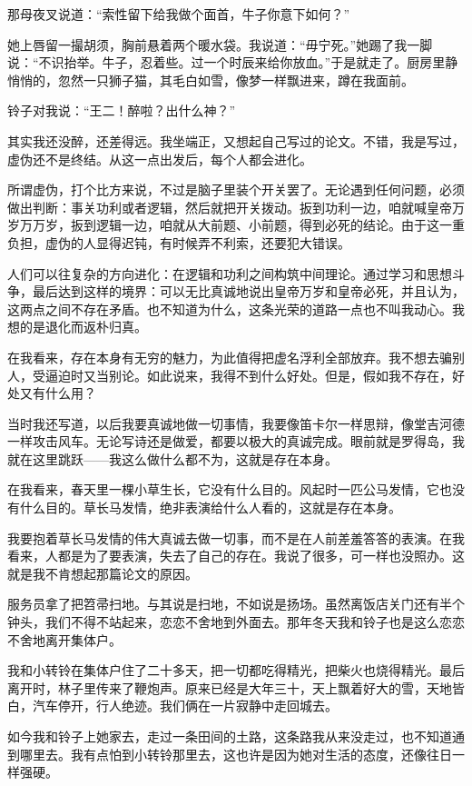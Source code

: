  那母夜叉说道：“索性留下给我做个面首，牛子你意下如何？” 
 
 她上唇留一撮胡须，胸前悬着两个暖水袋。我说道：“毋宁死。”她踢了我一脚说：“不识抬举。牛子，忍着些。过一个时辰来给你放血。”于是就走了。厨房里静悄悄的，忽然一只狮子猫，其毛白如雪，像梦一样飘进来，蹲在我面前。 
 
 铃子对我说：“王二！醉啦？出什么神？” 
 
 其实我还没醉，还差得远。我坐端正，又想起自己写过的论文。不错，我是写过，虚伪还不是终结。从这一点出发后，每个人都会进化。 
 
 所谓虚伪，打个比方来说，不过是脑子里装个开关罢了。无论遇到任何问题，必须做出判断：事关功利或者逻辑，然后就把开关拨动。扳到功利一边，咱就喊皇帝万岁万万岁，扳到逻辑一边，咱就从大前题、小前题，得到必死的结论。由于这一重负担，虚伪的人显得迟钝，有时候弄不利索，还要犯大错误。 
 
 人们可以往复杂的方向进化：在逻辑和功利之间构筑中间理论。通过学习和思想斗争，最后达到这样的境界：可以无比真诚地说出皇帝万岁和皇帝必死，并且认为，这两点之间不存在矛盾。也不知道为什么，这条光荣的道路一点也不叫我动心。我想的是退化而返朴归真。 
 
 在我看来，存在本身有无穷的魅力，为此值得把虚名浮利全部放弃。我不想去骗别人，受逼迫时又当别论。如此说来，我得不到什么好处。但是，假如我不存在，好处又有什么用？ 
 
 当时我还写道，以后我要真诚地做一切事情，我要像笛卡尔一样思辩，像堂吉河德一样攻击风车。无论写诗还是做爱，都要以极大的真诚完成。眼前就是罗得岛，我就在这里跳跃——我这么做什么都不为，这就是存在本身。 
 
 在我看来，春天里一棵小草生长，它没有什么目的。风起时一匹公马发情，它也没有什么目的。草长马发情，绝非表演给什么人看的，这就是存在本身。 
 
 我要抱着草长马发情的伟大真诚去做一切事，而不是在人前差羞答答的表演。在我看来，人都是为了要表演，失去了自己的存在。我说了很多，可一样也没照办。这就是我不肯想起那篇论文的原因。 
 
 服务员拿了把笤帚扫地。与其说是扫地，不如说是扬场。虽然离饭店关门还有半个钟头，我们不得不站起来，恋恋不舍地到外面去。那年冬天我和铃子也是这么恋恋不舍地离开集体户。 
 
 我和小转铃在集体户住了二十多天，把一切都吃得精光，把柴火也烧得精光。最后离开时，林子里传来了鞭炮声。原来已经是大年三十，天上飘着好大的雪，天地皆白，汽车停开，行人绝迹。我们俩在一片寂静中走回城去。 
 
 如今我和铃子上她家去，走过一条田间的土路，这条路我从来没走过，也不知道通到哪里去。我有点怕到小转铃那里去，这也许是因为她对生活的态度，还像往日一样强硬。 
 
